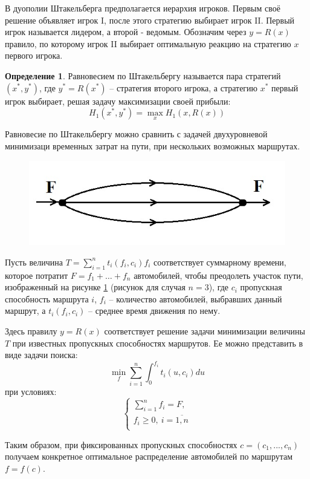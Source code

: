 \documentclass[12pt,a4paper,titlepage,oneside]{book}
\theoremstyle{definition}
\newtheorem{definition}{Определение}[chapter]
\theoremstyle{plain}
\theoremstyle{remark}
\theoremstyle{remark}
\theoremstyle{plain}
\theoremstyle{plain}
\begin{document}
В дуополии Штакельберга предполагается иерархия игроков. Первым своё решение объявляет игрок I, после этого стратегию выбирает игрок II. Первый игрок называется лидером, а второй - ведомым. Обозначим через $y = R(x)$ правило, по которому игрок II выбирает оптимальную реакцию на стратегию $x$ первого игрока.

\begin{definition}
Равновесием по Штакельбергу называется пара стратегий $(x^*,y^*)$, где $y^* = R(x^*)$ -- стратегия второго игрока, а стратегию $x^*$ первый игрок выбирает, решая задачу максимизации своей прибыли:
$$H_1(x^*,y^*) = \max_x H_1(x,R(x))$$
\end{definition}

Равновесие по Штакельбергу можно сравнить с задачей двухуровневой минимизаци временных затрат на пути, при нескольких возможных маршрутах. 

\begin{figure}[h]
	\centering
	\includegraphics[width=0.60\linewidth]{img51.jpg}
	\caption{} \label{img:img5.1}
\end{figure}

Пусть величина $\displaystyle T =\sum_{i=1}^n t_i(f_i,c_i) f_i$ соответствует суммарному времени, которое потратит $F=f_1 + \dots + f_n$ автомобилей, чтобы преодолеть участок пути, изображенный на рисунке \ref{img:img5.1} (рисунок для случая $n=3$), где $c_i$ пропускная способность маршрута $i$, $f_i$ -- количество автомобилей, выбравших данный маршрут, а $t_i(f_i,c_i)$ -- среднее время движения по нему. 

Здесь правилу $y=R(x)$ соответствует решение задачи минимизации величины $T$ при известных пропускных способностях маршрутов. Ее можно представить в виде задачи поиска:
$$\min_{f} \sum_{i=1}^n\int_{0}^{f_i}t_i(u,c_i)du$$
при условиях:
\begin{equation*}
\begin{cases}
\displaystyle \sum_{i=1}^n f_i = F, \\[3ex]
\displaystyle f_i \geqslant 0,~i=\overline{1,n}\\
\end{cases}
\end{equation*}

Таким образом, при фиксированных пропускных способностях $c=(c_1,...,c_n)$ получаем конкретное оптимальное распределение автомобилей по маршрутам $f=f(c)$.
\end{document}
